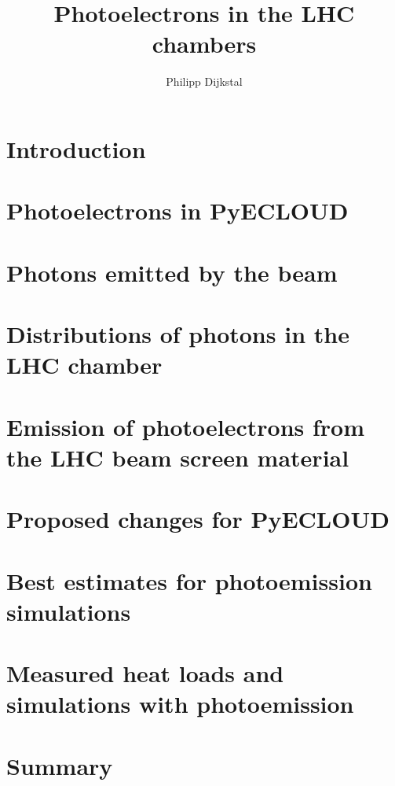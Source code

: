 \documentclass{scrartcl}
\title{Photoelectrons in the LHC chambers}
\author{Philipp Dijkstal}
\begin{document}
\maketitle
\tableofcontents
\clearpage

\section{Introduction}


\section{Photoelectrons in PyECLOUD}
    

\clearpage
\section{Photons emitted by the beam}
    

\clearpage
\section{Distributions of photons in the LHC chamber}
	

\clearpage
\section{Emission of photoelectrons from the LHC beam screen material}
	
    
    
    
    


\clearpage
\section{Proposed changes for PyECLOUD}
    

\clearpage
\section{Best estimates for photoemission simulations}
    \label{sec:best}
    

\clearpage
\section{Measured heat loads and simulations with photoemission}
    \label{sec:simulation}
    

\clearpage
\section{Summary}
    \label{sec:summary}
    

\clearpage
{}


\end{document}
